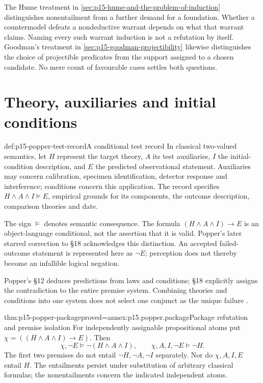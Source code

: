 The Hume treatment in \cref{sec:p15-hume-and-the-problem-of-induction}
distinguishes nonentailment from a further demand for a foundation.
Whether a countermodel defeats a nondeductive warrant depends on
what that warrant claims. Naming every such warrant induction is not
a refutation by itself. Goodman's treatment in
\cref{sec:p15-goodman-projectibility} likewise distinguishes the
choice of projectible predicates from the support assigned to a chosen
candidate. No mere count of favourable cases settles both questions.

\section{Theory, auxiliaries and initial conditions}
\label{sec:p15-popper-test-package}

\begin{hbdefinition}{def:p15-popper-test-record}{A conditional test record}
In classical two-valued semantics, let \(H\) represent the target
theory, \(A\) its test auxiliaries, \(I\) the initial-condition
description, and \(E\) the predicted observational statement.
Auxiliaries may concern calibration, specimen identification,
detector response and interference; conditions concern this application.
The record specifies \(H\land A\land I\models E\), empirical grounds
for its components, the outcome description, comparison theories and date.

The sign \(\models\) denotes semantic consequence.
The formula \((H\land A\land I)\to E\) is an object-language
conditional, not the assertion that it is valid. Popper's later
starred correction to \S18 acknowledges this distinction.
An accepted failed-outcome statement is represented here as \(\neg E\);
perception does not thereby become an infallible logical negation.
\end{hbdefinition}

Popper's \S12 deduces predictions from laws and conditions; \S18
explicitly assigns the contradiction to the entire premise system.
Combining theories and conditions into one system does not select
one conjunct as the unique failure
\parencite[\S\S12,18]{Popper2002LogicDiscoveryUI}.

\begin{hbtheorem}{thm:p15-popper-package}{proved=annex:p15.popper.package}{Package refutation and premise isolation}
For independently assignable propositional atoms put
\(\chi=((H\land A\land I)\to E)\). Then
\[
 \chi,\neg E\models\neg(H\land A\land I),\qquad
 \chi,A,I,\neg E\models\neg H.
\]
The first two premises do not entail \(\neg H,\neg A,\neg I\)
separately. Nor do \(\chi,A,I,E\) entail \(H\).
The entailments persist under substitution of arbitrary classical
formulas; the nonentailments concern the indicated independent atoms.
\end{hbtheorem}


